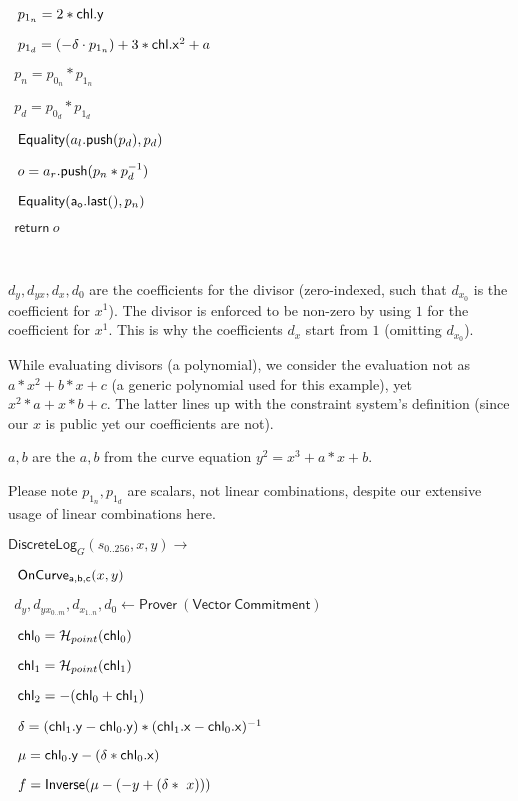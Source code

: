 \documentclass[]{article}
\begin{document}
$~~p_{1_n} = 2 * \mathsf{chl}\mathsf{.y}$

$~~p_{1_d} = (-\delta \cdot p_{1_n}) + 3 * \mathsf{chl}\mathsf{.x}^2 + a$

$~~p_n = p_{0_n} * p_{1_n}$

$~~p_d = p_{0_d} * p_{1_d}$

$~~\mathsf{Equality}(a_l\mathsf{.push}(p_d), p_d)$

$~~o = a_r\mathsf{.push}(p_n * p_d^{-1})$

$~~\mathsf{Equality}(\mathsf{a_o.last()}, p_n)$

$~~\mathsf{return} ~o$

\

$d_y, d_{yx}, d_x, d_0$ are the coefficients for the divisor (zero-indexed, such that $d_{x_0}$ is the coefficient for $x^1$). The divisor is enforced to be non-zero by using $1$ for the coefficient for $x^1$. This is why the coefficients $d_x$ start from $1$ (omitting $d_{x_0}$).

While evaluating divisors (a polynomial), we consider the evaluation not as $a * x^2 + b * x + c$ (a generic polynomial used for this example), yet $x^2 * a + x * b + c$. The latter lines up with the constraint system's definition (since our $x$ is public yet our coefficients are not).

$a, b$ are the $a, b$ from the curve equation $y^2 = x^3 + a * x + b$.

Please note $p_{1_n}, p_{1_d}$ are scalars, not linear combinations, despite our extensive usage of linear combinations here.

\pagebreak

\newcommand{\circuitin}{\leftarrow \mathsf{Prover ~(Vector ~Commitment)}}

\newcommand{\dlog}{\mathsf{DiscreteLog}}

$\dlog_G(s_{0..256}, x, y) \rightarrow$

$~~\mathsf{OnCurve_{a,b,c}}(x, y)$

$~~d_y, d_{yx_{0..m}}, d_{x_{1..n}}, d_0 \circuitin$

$~~\mathsf{chl}_0 = \mathcal{H}_{point}(\mathsf{chl}_0)$

$~~\mathsf{chl}_1 = \mathcal{H}_{point}(\mathsf{chl}_1)$

$~~\mathsf{chl}_2 = -(\mathsf{chl}_0 + \mathsf{chl}_1)$

$~~\delta = (\mathsf{chl}_1\mathsf{.y} - \mathsf{chl}_0\mathsf{.y}) * (\mathsf{chl}_1\mathsf{.x} - \mathsf{chl}_0\mathsf{.x})^{-1}$

$~~\mu = \mathsf{chl}_0\mathsf{.y} - (\delta * \mathsf{chl}_0\mathsf{.x})$

$~~f = \mathsf{Inverse}(\mu - (-y + (\delta * ~x)))$
\end{document}
